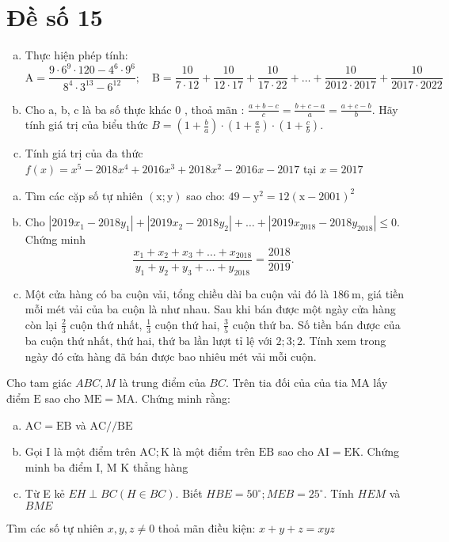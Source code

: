 \onehalfspacing
\section{Đề số 15}
\graphicspath{{./img/}}
\begin{bt} 
    \hfill
	\begin{enumerate}[a.]
		\item Thực hiện phép tính:
        $$
        \mathrm{A}=\frac{9 \cdot 6^9 \cdot 120-4^6 \cdot 9^6}{8^4 \cdot 3^{13}-6^{12}} ; \quad \mathrm{B}=\frac{10}{7 \cdot 12}+\frac{10}{12 \cdot 17}+\frac{10}{17 \cdot 22}+\ldots+\frac{10}{2012 \cdot 2017}+\frac{10}{2017 \cdot 2022}
        $$
        \item Cho a, b, c là ba số thực khác 0 , thoả mãn : $\frac{a+b-c}{c}=\frac{b+c-a}{a}=\frac{a+c-b}{b}$.
        Hãy tính giá trị của biểu thức $B=\left(1+\frac{b}{a}\right) \cdot\left(1+\frac{a}{c}\right) \cdot\left(1+\frac{c}{b}\right)$.
        \item Tính giá trị của đa thức $f(x)=x^5-2018 x^4+2016 x^3+2018 x^2-2016 x-2017$ tại $x=2017$
	\end{enumerate}
	\loigiai{} 
\end{bt}

\begin{bt}
	\hfill
	\begin{enumerate}[a.]
		\item Tìm các cặp số tự nhiên $(\mathrm{x} ; \mathrm{y})$ sao cho: $49-\mathrm{y}^2=12(\mathrm{x}-2001)^2$
        \item Cho $\left|2019 x_1-2018 y_1\right|+\left|2019 x_2-2018 y_2\right|+\ldots+\left|2019 x_{2018}-2018 y_{2018}\right| \leq 0$. Chứng minh
        $$
        \frac{x_1+x_2+x_3+\ldots+x_{2018}}{y_1+y_2+y_3+\ldots+y_{2018}}=\frac{2018}{2019} \text {. }
        $$
        \item Một cửa hàng có ba cuộn vải, tổng chiều dài ba cuộn vải đó là $186 \mathrm{~m}$, giá tiền mỗi mét vải của ba cuộn là như nhau. Sau khi bán được một ngày cửa hàng còn lại $\frac{2}{3}$ cuộn thứ nhất, $\frac{1}{3}$ cuộn thứ hai, $\frac{3}{5}$ cuộn thứ ba. Số tiền bán được của ba cuộn thứ nhất, thứ hai, thứ ba lần lượt tỉ lệ với $2 ; 3 ; 2$. Tính xem trong ngày đó cửa hàng đã bán được bao nhiêu mét vải mỗi cuộn.
	\end{enumerate}
	\loigiai{} 
\end{bt}

\begin{bt}
	Cho tam giác $A B C, M$ là trung điểm của $B C$. Trên tia đối của của tia MA lấy điểm $\mathrm{E}$ sao cho $\mathrm{ME}=\mathrm{MA}$. Chứng minh rằng:
	\begin{enumerate}[a.]
		\item $\mathrm{AC}=\mathrm{EB}$ và $\mathrm{AC} / / \mathrm{BE}$
        \item Gọi I là một điểm trên $\mathrm{AC} ; \mathrm{K}$ là một điểm trên $\mathrm{EB}$ sao cho $\mathrm{AI}=\mathrm{EK}$. Chứng minh ba điểm I, M $\mathrm{K}$ thẳng hàng
        \item Từ E kẻ $E H \perp B C(H \in B C)$. Biết $H B E=50^{\circ} ; M E B=25^{\circ}$. Tính $H E M$ và $B M E$
    \end{enumerate}
	\loigiai{}
\end{bt}

\begin{bt}
    Tìm các số tự nhiên $x, y, z \neq 0$ thoả mãn điều kiện: $x+y+z=x y z$
\loigiai{}
\end{bt}

